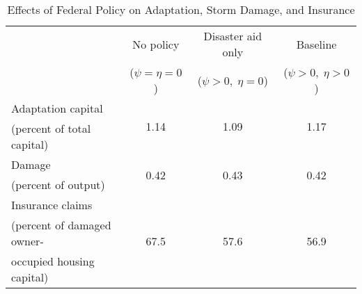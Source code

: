 \begin{table}[H] 
\singlespace 
\center 
\caption{Effects of Federal Policy on Adaptation, Storm Damage, and Insurance} \label{tab:federal_policy}
\vspace{-.1in} 
\begin{tabular}{l c c c}\hline 
\hline 
 	& No policy & Disaster aid only & Baseline \\[-0.5ex] 
 	& ($\psi = \eta =0$) & ($\psi >0, \; \eta =0$)  &  ($\psi >0, \; \eta >0$)  \\ 
\hline 
Adaptation capital &  \multirow{2}{*}{    1.14} & \multirow{2}{*}{    1.09} & \multirow{2}{*}{    1.17}  \\[-0.75ex](percent of total capital) \\Damage & \multirow{2}{*}{    0.42} & \multirow{2}{*}{    0.43} & \multirow{2}{*}{    0.42}  \\[-0.75ex](percent of output) \\Insurance claims & \multirow{3}{*}{    67.5} & \multirow{3}{*}{    57.6} & \multirow{3}{*}{    56.9}  \\[-0.75ex](percent of damaged owner- \\[-0.75ex]occupied housing capital) \\\hline 
\end{tabular}
\end{table} 
